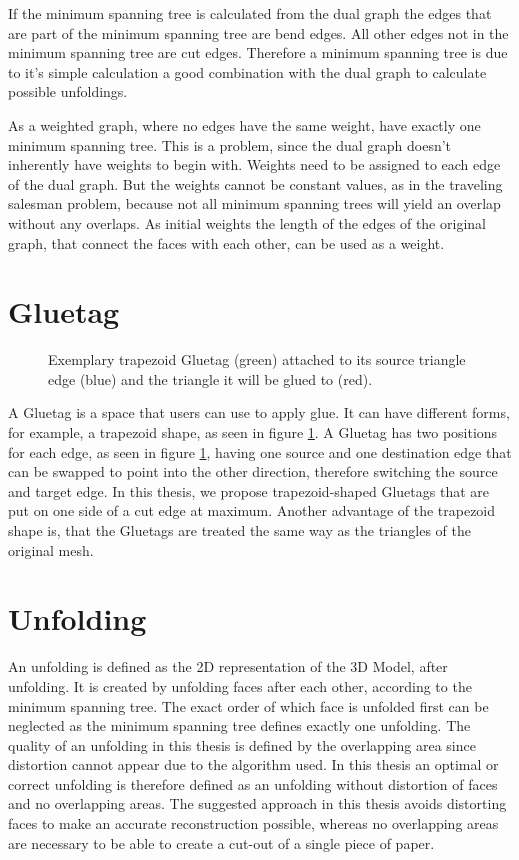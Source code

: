 \documentclass[draft,final]{vutinfth} %
\begin{document}
If the minimum spanning tree is calculated from the dual graph the edges that are part of the minimum spanning tree are bend edges. All other edges not in the minimum spanning tree are cut edges. Therefore a minimum spanning tree is due to it's simple calculation a good combination with the dual graph to calculate possible unfoldings. 

As a weighted graph, where no edges have the same weight, have exactly one minimum spanning tree. This is a problem, since the dual graph doesn't inherently have weights to begin with. Weights need to be assigned to each edge of the dual graph. But the weights cannot be constant values, as in the traveling salesman problem, because not all minimum spanning trees will yield an overlap without any overlaps. 
As initial weights the length of the edges of the original graph, that connect the faces with each other, can be used as a weight.

\section{Gluetag}
\begin{figure}

\caption{Exemplary trapezoid Gluetag (green) attached to its source triangle edge (blue) and the triangle it will be glued to (red).}
\label{fig:Gluetag}
\end{figure}

A Gluetag is a space that users can use to apply glue. It can have different forms, for example, a trapezoid shape, as seen in figure \ref{fig:Gluetag}. A Gluetag has two positions for each edge, as seen in figure \ref{fig:Gluetag}, having one source and one destination edge that can be swapped to point into the other direction, therefore switching the source and target edge. In this thesis, we propose trapezoid-shaped Gluetags that are put on one side of a cut edge at maximum. Another advantage of the trapezoid shape is, that the Gluetags are treated the same way as the triangles of the original mesh.

\section{Unfolding}
An unfolding is defined as the 2D representation of the 3D Model, after unfolding. It is created by unfolding faces after each other, according to the minimum spanning tree. The exact order of which face is unfolded first can be neglected as the minimum spanning tree defines exactly one unfolding. The quality of an unfolding in this thesis is defined by the overlapping area since distortion cannot appear due to the algorithm used. In this thesis an optimal or correct unfolding is therefore defined as an unfolding without distortion of faces and no overlapping areas. The suggested approach in this thesis avoids distorting faces to make an accurate reconstruction possible, whereas no overlapping areas are necessary to be able to create a cut-out of a single piece of paper.
\end{document}
